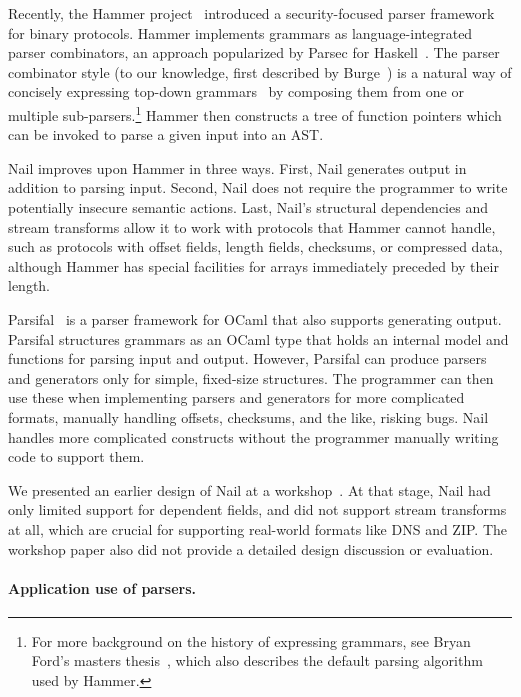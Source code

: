 Recently, the Hammer project~\cite{hammer-parser} introduced a security-focused parser framework for
binary protocols.
Hammer implements grammars as language-integrated parser combinators, an approach popularized by
Parsec for Haskell~\cite{LeijenMeijer:parsec}. The parser combinator style (to our knowledge, first
described by Burge~\cite{burge1975recursive}) is a natural way of concisely expressing top-down
grammars~\cite{Danielsson:2010:TPC:1863543.1863585}
by composing them from one or multiple sub-parsers.\footnote{For more
background on the history of expressing grammars, see Bryan Ford's
masters thesis~\cite{ford2002packrat}, which also describes the
default parsing algorithm used by Hammer.}
Hammer then constructs a tree of function pointers which can be invoked to parse a given input into
an AST\@.

Nail improves upon Hammer in three ways.  First, Nail generates output in
addition to parsing input.  Second, Nail does not require the programmer
to write potentially insecure semantic actions.  Last, Nail's structural
dependencies and stream transforms allow it to work with protocols that
Hammer cannot handle, such as protocols with offset fields, length fields,
checksums, or compressed data, although Hammer has special facilities for
arrays immediately preceded by their length.

Parsifal~\cite{ANSSI:parsifal} is a parser framework for OCaml that also supports
generating output.  Parsifal structures grammars as an OCaml
type that holds an internal model and functions for parsing input and
output.  However, Parsifal can produce parsers and generators
only for simple, fixed-size structures.  The programmer can then use
these when implementing parsers and generators for more complicated
formats, manually handling offsets, checksums, and the like, risking bugs.
Nail handles more complicated constructs without the programmer manually
writing code to support them.

We presented an earlier design of Nail at a
workshop~\cite{bangert:nail-langsec}.  At that stage, Nail had only
limited support for dependent fields, and did not support stream
transforms at all, which are crucial for supporting real-world formats
like DNS and ZIP\@.  The workshop paper also did not provide a detailed
design discussion or evaluation.


\paragraph{Application use of parsers.}

